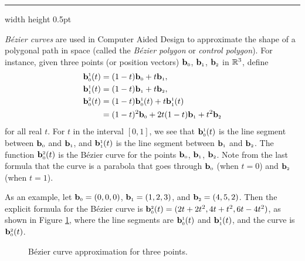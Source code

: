 \smallskip
\hrule width \textwidth height 0.5pt
\begin{exmp}\label{exmp:bezier}
 \emph{B\'{e}zier curves} are used in Computer Aided Design to approximate the shape of a
 polygonal path in space (called the \emph{B\'{e}zier polygon} or \emph{control polygon}). For instance, given three
 points (or position vectors) $\mathbf{b}_{\scriptscriptstyle 0}$, $\mathbf{b}_{\scriptscriptstyle 1}$, $\mathbf{b}_{\scriptscriptstyle 2}$ in $\mathbb{R}^{3}$,
 define
 \begin{align*}
  \mathbf{b}_{\scriptscriptstyle 0}^{\scriptscriptstyle 1}(t) &= ( 1 - t )\mathbf{b}_{\scriptscriptstyle 0} + t \mathbf{b}_{\scriptscriptstyle 1},\\
  \mathbf{b}_{\scriptscriptstyle 1}^{\scriptscriptstyle 1}(t) &= ( 1 - t )\mathbf{b}_{\scriptscriptstyle 1} + t \mathbf{b}_{\scriptscriptstyle 2},
  \\
  \mathbf{b}_{\scriptscriptstyle 0}^{\scriptscriptstyle 2}(t) &=
  ( 1 - t )\mathbf{b}_{\scriptscriptstyle 0}^{\scriptscriptstyle 1}(t) + t \mathbf{b}_{\scriptscriptstyle 1}^{\scriptscriptstyle 1}(t)\\
  &= (1 - t)^2 \mathbf{b}_{\scriptscriptstyle 0} + 2t(1 - t) \mathbf{b}_{\scriptscriptstyle 1} + t^2 \mathbf{b}_{\scriptscriptstyle 2}
 \end{align*}
 for all real $t$. For $t$ in the interval $[0,1]$, we see that $\mathbf{b}_{\scriptscriptstyle 0}^{\scriptscriptstyle 1}(t)$ is the
 line segment between $\mathbf{b}_{\scriptscriptstyle 0}$ and $\mathbf{b}_{\scriptscriptstyle 1}$, and
 $\mathbf{b}_{\scriptscriptstyle 1}^{\scriptscriptstyle 1}(t)$ is the line segment between $\mathbf{b}_{\scriptscriptstyle 1}$ and
 $\mathbf{b}_{\scriptscriptstyle 2}$. The function $\mathbf{b}_{\scriptscriptstyle 0}^{\scriptscriptstyle 2}(t)$ is the
 B\'{e}zier curve for the points $\mathbf{b}_{\scriptscriptstyle 0}$, $\mathbf{b}_{\scriptscriptstyle 1}$, $\mathbf{b}_{\scriptscriptstyle 2}$. Note from the
 last formula that the curve is a parabola that goes through $\mathbf{b}_{\scriptscriptstyle 0}$ (when $t = 0$) and
 $\mathbf{b}_{\scriptscriptstyle 2}$ (when $t = 1$).
 
 As an example, let $\mathbf{b}_{\scriptscriptstyle 0} = (0,0,0)$, $\mathbf{b}_{\scriptscriptstyle 1} = (1,2,3)$, and $\mathbf{b}_{\scriptscriptstyle 2} =
 (4,5,2)$. Then the explicit formula for the B\'{e}zier curve is
 $\mathbf{b}_{\scriptscriptstyle 0}^{\scriptscriptstyle 2}(t) = ( 2t + 2t^2, 4t + t^2, 6t - 4t^2 )$, as shown in Figure
 \ref{fig:bezier2}, where the line segments are $\mathbf{b}_{\scriptscriptstyle 0}^{\scriptscriptstyle 1}(t)$ and
 $\mathbf{b}_{\scriptscriptstyle 1}^{\scriptscriptstyle 1}(t)$, and the curve is
 $\mathbf{b}_{\scriptscriptstyle 0}^{\scriptscriptstyle 2}(t)$.
 \begin{figure}[h]
  \begin{center}
   
  \end{center}
 \caption[]{\quad B\'{e}zier curve approximation for three points.}
 \label{fig:bezier2}
 \end{figure}


\end{exmp}
